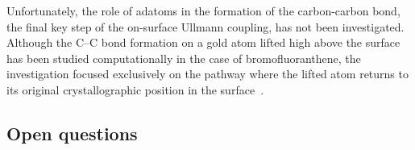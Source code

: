 \documentclass[aps,prb,reprint,amsmath,amssymb]{revtex4-1}
\newcommand{\lock}{\color{red}}
\newcommand{\lock}{\color{black}}
\begin{document}




{\lock

Unfortunately, the role of adatoms in the formation of the carbon-carbon bond, the final key step of the on-surface Ullmann coupling, has not been investigated. Although the C--C bond formation on a gold atom lifted high above the surface has been studied computationally in the case of bromofluoranthene,
the investigation focused exclusively on the pathway where the lifted atom returns to its original crystallographic position in the surface~\cite{jpcc2018}. 

}

\ifdefined\INTERNAL

\subsection{Open questions}
\end{document}
